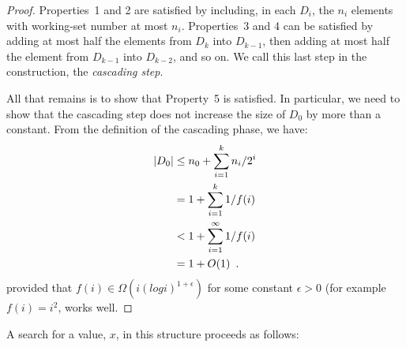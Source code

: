 \documentclass{patmorin}
\begin{document}
\begin{proof}
  Properties~1 and 2 are satisfied by including, in each $D_i$, the $n_i$
  elements with working-set number at most $n_i$.  Properties~3 and
  4 can be satisfied by adding at most half the elements from $D_k$
  into $D_{k-1}$, then adding at most half the element from $D_{k-1}$
  into $D_{k-2}$, and so on.  We call this last step in the construction,
  the \emph{cascading step}.

  All that remains is to show that Property~5 is satisfied.
  In particular, we need to show that the cascading step does not
  increase the size of $D_0$ by more than a constant.  From the definition
  of the cascading phase, we have:
  \begin{align*}
    |D_0| 
      & \le n_0 + \sum_{i=1}^{k} n_{i}/2^i  \\
      & = 1 + \sum_{i=1}^{k} 1/f(i) \\
      & < 1 + \sum_{i=1}^{\infty} 1/f(i) \\
      & = 1 + O(1)  \enspace . \qedhere
  \end{align*}
  provided that $f(i)\in\Omega(i(log i)^{1+\epsilon})$ for some constant
  $\epsilon >0$ (for example $f(i)=i^2$, works well.
\end{proof}

%
%
%
%
%
%

A search for a value, $x$, in this structure proceeds as follows:\\
\begin{minipage}{\textwidth}
\begin{algorithmic}[1]
  \ENDIF
\ENDWHILE
\end{algorithmic}
\end{minipage}
\end{document}
